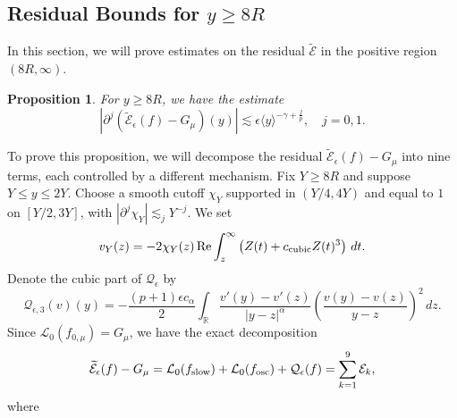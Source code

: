 \documentclass[11pt]{amsart}
\newtheorem{proposition}[theorem]{Proposition}
\theoremstyle{definition}
\theoremstyle{remark}
\numberwithin{equation}{section}
\newcommand{\sq}[1]{\widetilde{#1}}
\newcommand{\R}{\mathbb{R}}
\newcommand{\mc}[1]{\mathcal{#1}}
\newcommand{\ang}[1]{\langle #1 \rangle}
\begin{document}
\subsection{Residual Bounds for \texorpdfstring{$y \geq 8R$}{y >= 8R}} 
In this section, we will prove estimates on the residual $\sq{\mc{E}}$ in the positive region $(8R, \infty)$. 

\begin{proposition}\label{prop:approx_residual_positive}
    For $y \geq 8R$, we have the estimate
    \[|\partial^j(\sq{\mc{E}}_\epsilon(f)-G_\mu)(y)| \lesssim \epsilon \ang{y}^{-\gamma + \frac{j}{p}}, \quad j = 0,1.\]
\end{proposition}

To prove this proposition, we will decompose the residual $\sq{\mc{E}}_\epsilon(f)-G_\mu$ into nine terms, each controlled by a different mechanism. Fix $Y\geq8R$ and suppose $Y\leq y\leq2Y$. Choose a smooth cutoff $\chi_Y$ supported in $(Y/4,4Y)$ and equal to $1$ on $[Y/2,3Y]$, with $|\partial^j\chi_Y|\lesssim_j Y^{-j}$.
We set
\begin{equation}\label{eqn:approx_local_oscillatory_front}
    v_Y(z)=-2\chi_Y(z)\operatorname{Re}\int_z^\infty
    \left(Z(t)+c_{\textup{cubic}}Z(t)^3\right)\,dt.
\end{equation}
Denote the cubic part of $\mc{Q}_\epsilon$ by
\begin{equation}\label{eqn:approx_cubic_operator}
    \mc{Q}_{\epsilon,3}(v)(y)
    =-\frac{(p+1)\epsilon c_\alpha}{2}\int_{\R}
    \frac{v'(y)-v'(z)}{|y-z|^\alpha}
    \left(\frac{v(y)-v(z)}{y-z}\right)^2\,dz.
\end{equation}
Since $\mc{L}_0(f_{0,\mu})=G_\mu$, we have the exact decomposition
\begin{equation}\label{eqn:approx_residual_decomposition}
    \sq{\mc{E}}_\epsilon(f)-G_\mu
    =\mc{L}_0(f_{\textup{slow}})+\mc{L}_0(f_{\textup{osc}})+\mc{Q}_\epsilon(f)
    =\sum_{k=1}^9\mc{E}_k,
\end{equation}
where
\begingroup
\allowdisplaybreaks[4]
\end{document}
